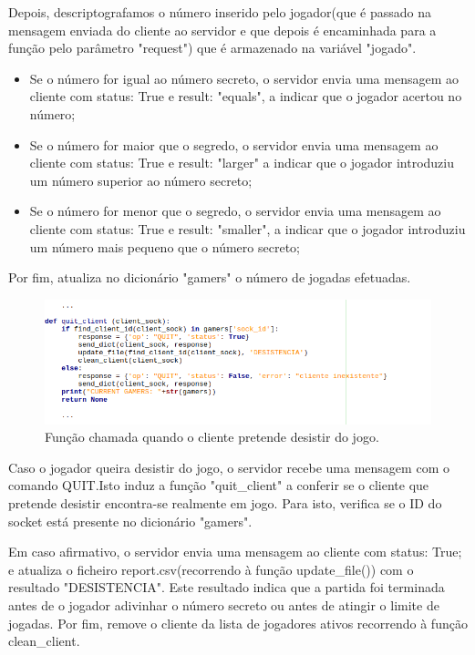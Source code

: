 \documentclass{report}
\begin{document}
Depois, descriptografamos o número inserido pelo jogador(que é passado na mensagem enviada do cliente ao servidor e que depois é encaminhada para a função pelo parâmetro "request") que é armazenado na variável "jogado".
\begin{itemize}
\item Se o número for igual ao número secreto, o servidor envia uma mensagem ao cliente com status: True e result: "equals", a indicar que o jogador acertou no número;
\item Se o número for maior que o segredo, o servidor envia uma mensagem ao cliente com status: True e result: "larger" a indicar que o jogador introduziu um número superior ao número secreto;
\item Se o número for menor que o segredo, o servidor envia uma mensagem ao cliente com status: True e result: "smaller", a indicar que o jogador introduziu um número mais pequeno que o número secreto;
\end{itemize}
Por fim, atualiza no dicionário "gamers" o número de jogadas efetuadas.

\begin{figure}[H]
        \centering
        \includegraphics[scale=0.65]{quit_client}       
        \caption{Função chamada quando o cliente pretende desistir do jogo.}
\end{figure}
Caso o jogador queira desistir do jogo, o servidor recebe uma mensagem com o comando QUIT.Isto induz  a função "quit\_client" a conferir se o cliente que pretende desistir encontra-se realmente em jogo. Para isto, verifica se o ID do socket está presente no dicionário "gamers".

Em caso afirmativo, o servidor envia uma mensagem ao cliente com status: True; e atualiza o ficheiro report.csv(recorrendo à função update\_file()) com o resultado "DESISTENCIA". Este resultado indica que a partida foi terminada antes de o jogador adivinhar o número secreto ou antes de atingir o limite de jogadas. Por fim, remove o cliente da lista de jogadores ativos recorrendo à função clean\_client.
\end{document}
